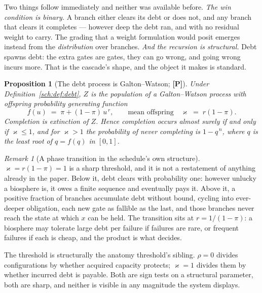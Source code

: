 \documentclass[11pt]{article}
\numberwithin{equation}{section}
\theoremstyle{plain}
\newtheorem{proposition}[theorem]{Proposition}
\theoremstyle{definition}
\theoremstyle{remark}
\newtheorem{remark}[theorem]{Remark}
\begin{document}
Two things follow immediately and neither was available before. \emph{The win condition is binary.} A branch either clears its debt or
does not, and any branch that clears it completes --- however deep the
debt ran, and with no residual weight to carry. The grading that a
weight formulation would posit emerges instead from the
\emph{distribution} over branches. \emph{And the recursion is structural.} Debt spawns debt: the extra
gates are gates, they can go wrong, and going wrong incurs more. That is
the cascade's shape, and the object it makes is standard.

\begin{proposition}[The debt process is Galton--Watson; \textbf{[P]}]
\label{sch:prop:gw}
Under Definition~\ref{sch:def:debt}, $Z$ is the population of a
Galton--Watson process with offspring probability generating function
\begin{equation}\label{sch:eq:pgf}
f(u)\;=\;\pi+(1-\pi)\,u^{\,r},
\qquad\text{mean offspring}\quad \varkappa\;=\;r(1-\pi).
\end{equation}
Completion is extinction of $Z$. Hence completion occurs almost surely
if and only if $\varkappa\le1$, and for $\varkappa>1$ the probability of never
completing is $1-q^{\,n}$, where $q$ is the least root of $q=f(q)$ in
$[0,1]$.
\end{proposition}

\begin{remark}[A phase transition in the schedule's own structure]
\label{sch:rem:criticality}
$\varkappa=r(1-\pi)=1$ is a sharp threshold, and it is not a restatement of
anything already in the paper. Below it, debt clears with probability one: however unlucky a biosphere
is, it owes a finite sequence and eventually pays it. Above it, a
positive fraction of branches accumulate debt without bound, cycling
into ever-deeper obligation, each new gate as fallible as the last, and those branches never reach the state at which $x$ can be held. The
transition sits at $r=1/(1-\pi)$: a biosphere may tolerate large debt
per failure if failures are rare, or frequent failures if each is cheap,
and the product is what decides.

The threshold is structurally the anatomy threshold's sibling. $\rho=0$
divides configurations by whether acquired capacity protects; $\varkappa=1$
divides them by whether incurred debt is payable. Both are sign tests on
a structural parameter, both are sharp, and neither is visible in any
magnitude the system displays.
\end{remark}
\end{document}

